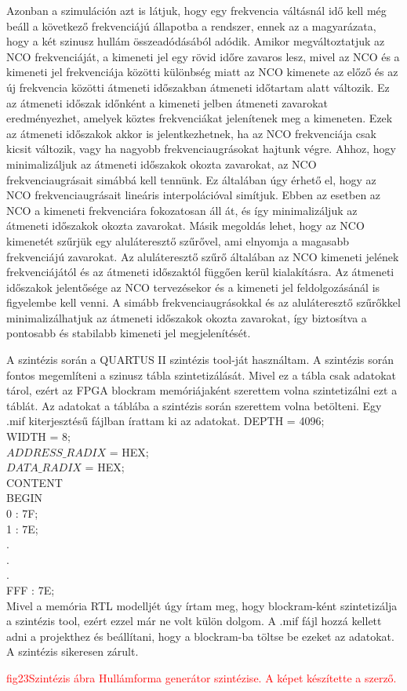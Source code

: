 \documentclass[a4paper,12pt]{article}
\begin{document}
	Azonban a szimuláción azt is látjuk, hogy egy frekvencia váltásnál idő kell még beáll a következő frekvenciájú állapotba a rendszer, ennek az a magyarázata, hogy 
	a két szinusz hullám összeadódásából adódik. Amikor megváltoztatjuk az NCO frekvenciáját, a kimeneti jel egy rövid időre zavaros lesz, mivel az NCO és a kimeneti jel frekvenciája közötti különbség miatt az NCO kimenete az előző és az új frekvencia közötti átmeneti időszakban átmeneti időtartam alatt változik.
	Ez az átmeneti időszak időnként a kimeneti jelben átmeneti zavarokat eredményezhet, amelyek köztes frekvenciákat jelenítenek meg a kimeneten. Ezek az átmeneti időszakok akkor is jelentkezhetnek, ha az NCO frekvenciája csak kicsit változik, vagy ha nagyobb frekvenciaugrásokat hajtunk végre.
	Ahhoz, hogy minimalizáljuk az átmeneti időszakok okozta zavarokat, az NCO frekvenciaugrásait simábbá kell tennünk. Ez általában úgy érhető el, hogy az NCO frekvenciaugrásait lineáris interpolációval simítjuk. Ebben az esetben az NCO a kimeneti frekvenciára fokozatosan áll át, és így minimalizáljuk az átmeneti időszakok okozta zavarokat.
	Másik megoldás lehet, hogy az NCO kimenetét szűrjük egy aluláteresztő szűrővel, ami elnyomja a magasabb frekvenciájú zavarokat. Az aluláteresztő szűrő általában az NCO kimeneti jelének frekvenciájától és az átmeneti időszaktól függően kerül kialakításra.
	Az átmeneti időszakok jelentősége az NCO tervezésekor és a kimeneti jel feldolgozásánál is figyelembe kell venni. A simább frekvenciaugrásokkal és az aluláteresztő szűrőkkel minimalizálhatjuk az átmeneti időszakok okozta zavarokat, így biztosítva a pontosabb és stabilabb kimeneti jel megjelenítését.
	
	A szintézis során a QUARTUS II szintézis tool-ját használtam. A szintézis során fontos megemlíteni a szinusz tábla szintetizálását. Mivel ez a tábla csak adatokat tárol, ezért az FPGA blockram memóriájaként szerettem volna szintetizálni ezt a táblát. Az adatokat a táblába a szintézis során szerettem volna betölteni. Egy .mif kiterjesztésű fájlban írattam ki az adatokat.
	DEPTH = 4096;\\
	WIDTH = 8;\\
	$ADDRESS\_RADIX$ = HEX;\\
	$DATA\_RADIX$ = HEX;\\
	CONTENT\\
	BEGIN\\
	0 : 7F;\\
	1 : 7E;\\
	.\\
	.\\
	.\\
	FFF : 7E;\\
	Mivel a memória RTL modelljét úgy írtam meg, hogy blockram-ként szintetizálja a szintézis tool, ezért ezzel már ne volt külön dolgom. A .mif fájl hozzá kellett adni a projekthez és beállítani, hogy a blockram-ba töltse be ezeket az adatokat. A szintézis sikeresen zárult.
	\begin{center}
		\textcolor{red}{
			fig23Szintézis ábra
			Hullámforma generátor szintézise. A képet készítette a szerző.
		}
	\end{center}
	\newpage
	
\end{document}
